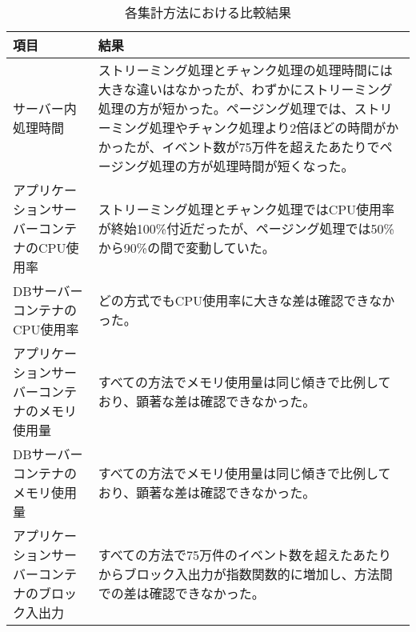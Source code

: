 \documentclass[../../../main]{subfiles}
\begin{document}
    \begin{table}[H]
        \centering
        \caption{各集計方法における比較結果}
        \label{tab:result-comparison}
        \begin{tabular}{|p{4cm}|p{10cm}|}
            \hline
            \textbf{項目}              & \textbf{結果}                                                                                                                                                                                                          \\ \hline
            サーバー内処理時間                & ストリーミング処理とチャンク処理の処理時間には大きな違いはなかったが、わずかにストリーミング処理の方が短かった。ページング処理では、ストリーミング処理やチャンク処理より2倍ほどの時間がかかったが、イベント数が75万件を超えたあたりでページング処理の方が処理時間が短くなった。 \\ \hline
            アプリケーションサーバーコンテナのCPU使用率  & ストリーミング処理とチャンク処理ではCPU使用率が終始100\%付近だったが、ページング処理では50\%から90\%の間で変動していた。                                                                                                                                                   \\ \hline
            DBサーバーコンテナのCPU使用率        & どの方式でもCPU使用率に大きな差は確認できなかった。                                                                                                                                                                                                   \\ \hline
            アプリケーションサーバーコンテナのメモリ使用量  & すべての方法でメモリ使用量は同じ傾きで比例しており、顕著な差は確認できなかった。                                                                                                                                                                                   \\ \hline
            DBサーバーコンテナのメモリ使用量        & すべての方法でメモリ使用量は同じ傾きで比例しており、顕著な差は確認できなかった。                                                                                                                                                                                   \\ \hline
            アプリケーションサーバーコンテナのブロック入出力 & すべての方法で75万件のイベント数を超えたあたりからブロック入出力が指数関数的に増加し、方法間での差は確認できなかった。                                                                                                                                                                       \\ \hline

\end{tabular}
\end{table}
\end{document}
